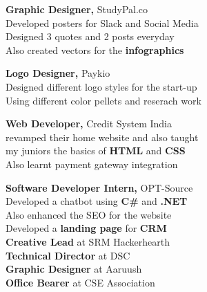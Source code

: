 
\textbf{\small{Graphic Designer,}} \small{StudyPal.co} \hspace{2.9em} \\\smallskip
{Developed posters for Slack and Social Media}\\\smallskip
{Designed 3 quotes and 2 posts everyday}\\\smallskip
{Also created vectors for the \textbf{infographics}}
\\\medskip

\textbf{\small{Logo Designer,}} \small{Paykio}  \hspace{7.7em} \\\smallskip
{Designed different logo styles for the start-up}\\\smallskip
{Using different color pellets and reserach work}\\\medskip

\textbf{\small{Web Developer,}}  \small{Credit System India} \hspace{1em} \\\smallskip
{revamped their home website and also taught}\\\smallskip
{my juniors the basics of \textbf{HTML} and \textbf{CSS}}\\\smallskip
{Also learnt payment gateway integration }\\\medskip

\textbf{\small{Software Developer Intern,}} \small{OPT-Source} \hspace{0.1em} \\\smallskip
{Developed a chatbot using \textbf{C#} and \textbf{.NET}}\\\smallskip
{Also enhanced the SEO for the website}\\\smallskip
{Developed a \textbf{landing page} for \textbf{CRM} }\\\medskip
{}
{\textbf{Creative Lead} at SRM Hackerhearth} \hspace{1.5em} \\\medskip
{\textbf{Technical Director} at DSC} \hspace{6.3em}  \\\medskip
{\textbf{Graphic Designer} at Aaruush} \hspace{4.6em} \\\medskip
{\textbf{Office Bearer} at CSE Association} \hspace{3em} \\\medskip



